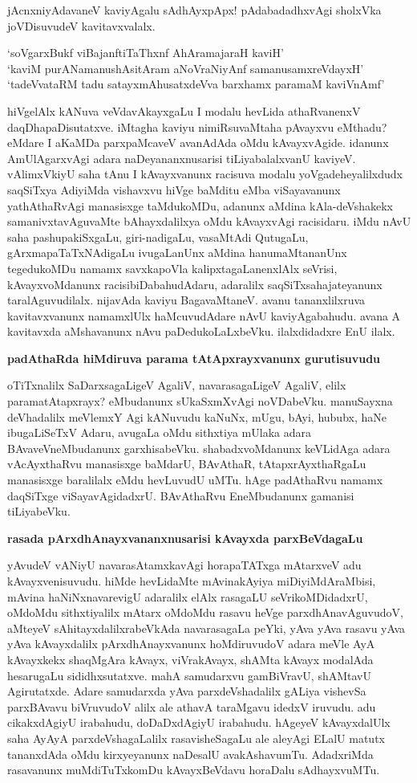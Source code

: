 jAcnxniyAdavaneV kaviyAgalu sAdhAyxpApx! pAdabadadhxvAgi sholxVka joVDisuvudeV kavitavxvalalx.

\begin{shloka}
`soVgarxBukf viBajanftiTaThxnf AhAramajaraH kaviH'\\
`kaviM purANamanushAsitAram aNoVraNiyAnf samanusamxreVdayxH'\\
`tadeVvataRM tadu satayxmAhusatxdeVva barxhamx paramaM kaviVnAmf'
\end{shloka}                    

hiVgelAlx kANuva veVdavAkayxgaLu I modalu hevLida athaRvanenxV daqDhapaDisutatxve. iMtagha kaviyu nimiRsuvaMtaha pAvayxvu eMthadu? eMdare I aKaMDa parxpaMcaveV avanAdAda oMdu kAvayxvAgide. idanunx AmUlAgarxvAgi adara naDeyananxnusarisi tiLiyabalalxvanU kaviyeV. vAlimxVkiyU saha tAnu I kAvayxvanunx racisuva modalu yoVgadeheyalilxdudx saqSiTxya AdiyiMda vishavxvu hiVge baMditu eMba viSayavanunx yathAthaRvAgi manasisxge taMdukoMDu, adanunx aMdina kAla-deVshakekx samanivxtavAguvaMte bAhayxdalilxya oMdu kAvayxvAgi racisidaru. iMdu nAvU saha pashupakiSxgaLu, giri-nadigaLu, vasaMtAdi QutugaLu, gArxmapaTaTxNAdigaLu ivugaLanUnx aMdina hanumaMtananUnx tegedukoMDu namamx savxkapoVla kalipxtagaLanenxlAlx seVrisi, kAvayxvoMdanunx racisibiDabahudAdaru, adaralilx saqSiTxsahajateyanunx taralAguvudilalx. nijavAda kaviyu BagavaMtaneV. avanu tananxlilxruva kavitavxvanunx namamxlUlx haMcuvudAdare nAvU kaviyAgabahudu. avana A kavitavxda aMshavanunx nAvu paDedukoLaLxbeVku. ilalxdidadxre EnU ilalx.

{\bf padAthaRda hiMdiruva parama tAtApxrayxvanunx gurutisuvudu}

oTiTxnalilx SaDarxsagaLigeV AgaliV, navarasagaLigeV AgaliV, elilx paramatAtapxrayx? eMbudanunx sUkaSxmXvAgi noVDabeVku. manuSayxna deVhadalilx meVlemxY Agi kANuvudu kaNuNx, mUgu, bAyi, hububx, haNe ibugaLiSeTxV Adaru, avugaLa oMdu sithxtiya mUlaka adara BAvaveVneMbudanunx garxhisabeVku. shabadxvoMdanunx keVLidAga adara vAcAyxthaRvu manasisxge baMdarU, BAvAthaR, tAtapxrAyxthaRgaLu manasisxge baralilalx eMdu hevLuvudU uMTu. hAge padAthaRvu namamx daqSiTxge viSayavAgidadxrU. BAvAthaRvu EneMbudanunx gamanisi tiLiyabeVku.

{\bf rasada pArxdhAnayxvananxnusarisi kAvayxda parxBeVdagaLu}

yAvudeV vANiyU navarasAtamxkavAgi horapaTATxga mAtarxveV adu kAvayxvenisuvudu. hiMde hevLidaMte mAvinakAyiya miDiyiMdAraMbisi, mAvina haNiNxnavarevigU adaralilx elAlx rasagaLU seVrikoMDidadxrU, oMdoMdu sithxtiyalilx mAtarx oMdoMdu rasavu heVge parxdhAnavAguvudoV, aMteyeV sAhitayxdalilxrabeVkAda navarasagaLa peYki, yAva yAva rasavu yAva yAva kAvayxdalilx pArxdhAnayxvanunx hoMdiruvudoV adara meVle AyA kAvayxkekx shaqMgAra kAvayx, viVrakAvayx, shAMta kAvayx modalAda hesarugaLu sididhxsutatxve. mahA samudarxvu gamBiVravU, shAMtavU Agirutatxde. Adare samudarxda yAva parxdeVshadalilx gALiya vishevSa parxBAvavu biVruvudoV alilx ale athavA taraMgavu idedxV iruvudu. adu cikakxdAgiyU irabahudu, doDaDxdAgiyU irabahudu. hAgeyeV kAvayxdalUlx saha AyAyA parxdeVshagaLalilx rasavisheSagaLu ale aleyAgi ELalU matutx tananxdAda oMdu kirxyeyanunx naDesalU avakAshavumTu. AdadxriMda rasavanunx muMdiTuTxkomDu kAvayxBeVdavu horaDalu sAdhayxvuMTu.

